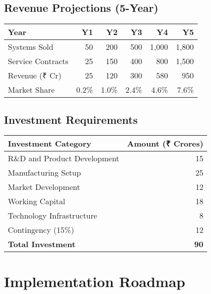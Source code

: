 \documentclass[11pt,a4paper]{article}
\begin{document}
\subsection{Revenue Projections (5-Year)}
\begin{center}
\begin{tabular}{lrrrrr}
\toprule
\textbf{Year} & \textbf{Y1} & \textbf{Y2} & \textbf{Y3} & \textbf{Y4} & \textbf{Y5} \\
\midrule
Systems Sold & 50 & 200 & 500 & 1,000 & 1,800 \\
Service Contracts & 25 & 150 & 400 & 800 & 1,500 \\
Revenue (₹ Cr) & 25 & 120 & 300 & 580 & 950 \\
Market Share & 0.2\% & 1.0\% & 2.4\% & 4.6\% & 7.6\% \\
\bottomrule
\end{tabular}
\end{center}

\subsection{Investment Requirements}
\begin{center}
\begin{tabular}{lr}
\toprule
\textbf{Investment Category} & \textbf{Amount (₹ Crores)} \\
\midrule
R\&D and Product Development & 15 \\
Manufacturing Setup & 25 \\
Market Development & 12 \\
Working Capital & 18 \\
Technology Infrastructure & 8 \\
Contingency (15\%) & 12 \\
\midrule
\textbf{Total Investment} & \textbf{90} \\
\bottomrule
\end{tabular}
\end{center}

\section{Implementation Roadmap}
\end{document}
